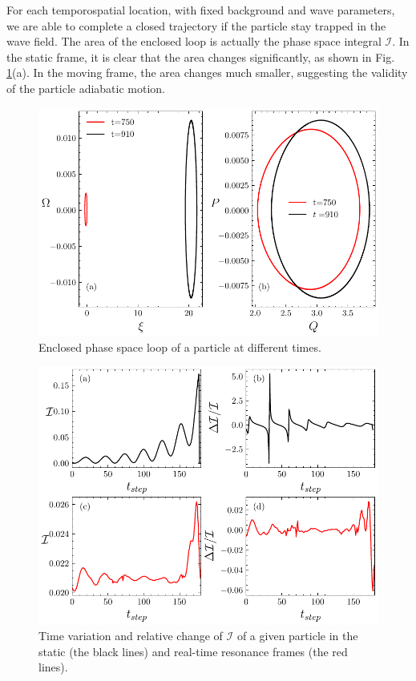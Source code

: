 For each temporospatial location, with fixed background and wave parameters, we are able to complete a closed trajectory if the particle stay trapped in the wave field.  
The area of the enclosed loop is actually the phase space integral $\mathcal{I}$.
In the static frame, it is clear that the area changes significantly,
as shown in Fig. \ref{fig.area}(a). In the moving frame, the area changes much smaller, suggesting the validity of the particle adiabatic motion. 
\begin{figure}
    \centering
    \includegraphics[scale=0.5]{img/area.pdf}
    \caption{Enclosed phase space loop of a particle at different times.
    \label{fig.area}
    }
\end{figure}
\begin{figure}
    \centering
    \includegraphics[scale=0.5]{img/adiaI.pdf}
    \caption{Time variation and 
relative change
     of $\mathcal{I}$ of a given particle in the static (the black lines) and  real-time resonance  frames (the red lines).  
    }
    \label{fig.I}
\end{figure}

